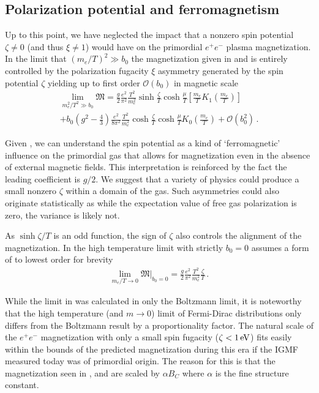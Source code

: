 \subsection{Polarization potential and ferromagnetism}
\label{sec:ferro}
\noindent Up to this point, we have neglected the impact that a nonzero spin potential $\zeta\neq0$ (and thus $\xi\neq1$) would have on the primordial $e^{+}e^{-}$ plasma magnetization. In the limit that $(m_{e}/T)^2\gg b_0$ the magnetization given in  and  is entirely controlled by the polarization fugacity $\xi$ asymmetry generated by the spin potential $\zeta$ yielding up to first order $\mathcal{O}(b_{0})$ in magnetic scale
\begin{multline}
 \label{ferro}
 \lim_{m_{e}^{2}/T^{2}\gg b_0}{\mathfrak M}=\frac{g}{2}\frac{e^{2}}{\pi^{2}}\frac{T^{2}}{m_{e}^{2}}\sinh{\frac{\zeta}{T}}\cosh{\frac{\mu}{T}}\left[\frac{m_{e}}{T}K_{1}\left(\frac{m_{e}}{T}\right)\right]\\
 +b_{0}\left(g^{2}-\frac{4}{3}\right)\frac{e^{2}}{8\pi^{2}}\frac{T^{2}}{m_{e}^{2}}\cosh{\frac{\zeta}{T}}\cosh{\frac{\mu}{T}}K_{0}\left(\frac{m_{e}}{T}\right)
 +\mathcal{O}\left(b_{0}^{2}\right)\,.
\end{multline}

Given , we can understand the spin potential as a kind of `ferromagnetic' influence on the primordial gas that allows for magnetization even in the absence of external magnetic fields. This interpretation is reinforced by the fact the leading coefficient is $g/2$. We suggest that a variety of physics could produce a small nonzero $\zeta$ within a domain of the gas. Such asymmetries could also originate statistically as while the expectation value of free gas polarization is zero, the variance is likely not.

As $\sinh{\zeta/T}$ is an odd function, the sign of $\zeta$ also controls the alignment of the magnetization. In the high temperature limit  with strictly $b_{0}=0$ assumes a form of to lowest order for brevity
\begin{align}
 \label{hiTferro}
 \lim_{m_{e}/T\rightarrow0}{\mathfrak M}\vert_{b_{0}=0}=\frac{g}{2}\frac{e^{2}}{\pi^{2}}\frac{T^{2}}{m_{e}^{2}}\frac{\zeta}{T}\,.
\end{align}

While the limit in  was calculated in only the Boltzmann limit, it is noteworthy that the high temperature (and $m\rightarrow0$) limit of Fermi-Dirac distributions only differs from the Boltzmann result by a proportionality factor. The natural scale of the $e^{+}e^{-}$ magnetization with only a small spin fugacity ($\zeta<1\text{\,eV}$) fits easily within the bounds of the predicted magnetization during this era if the IGMF measured today was of primordial origin. The reason for this is that the magnetization seen in ,  and  are scaled by $\alpha{B}_{C}$ where $\alpha$ is the fine structure constant.


